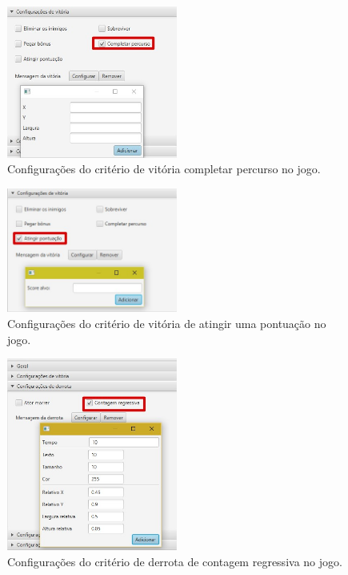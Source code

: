 \documentclass[12pt,oneside,openright,a4paper,english,brazil,sumario=tradicional]{abntex2}
\begin{document}
\begin{anexosenv}
   \begin{figure}[H]
   \centering
   \includegraphics[width=0.5\textwidth]{images/vitoria_completar_perc.jpg}
   \caption{Configurações do critério de vitória completar percurso no jogo.}
   \label{fig:vitoria_completar_perc}
   \end{figure}

   \begin{figure}[H]
   \centering
   \includegraphics[width=0.5\textwidth]{images/vitoria_atingir_pont.jpg}
   \caption{Configurações do critério de vitória de atingir uma pontuação no jogo.}
   \label{fig:vitoria_atingir_pont}
   \end{figure}

   \begin{figure}[H]
   \centering
   \includegraphics[width=0.5\textwidth]{images/derrota_cont_regress.jpg}
   \caption{Configurações do critério de derrota de contagem regressiva no jogo.}
   \label{fig:derrota_cont_regress}
   \end{figure}


\end{anexosenv}
\end{document}
